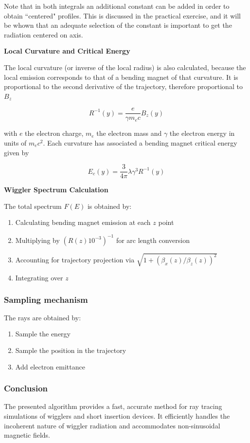 Note that in both integrals an additional constant can be added in order to obtain ``centered" profiles. This is discussed in the practical exercise, and it will be whown that an adequate selection of the constant is important to get the radiation centered on axis. 

\textbf{Local Curvature and Critical Energy}

The local curvature (or inverse of the local radius) is also
calculated, because the local emission corresponds to that of
a bending magnet of that curvature. It is proportional to the
second derivative of the trajectory, therefore proportional to $B_z$

\begin{equation}
R^{-1}(y) = \frac{e}{\gamma m_e c} B_z(y)
\end{equation}

with $e$ the electron charge, $m_e$ the electron mass and $\gamma$ the
electron energy in units of $m_e c^2$. Each curvature has associated a bending magnet critical energy given by

\begin{equation}
E_c(y) = \frac{3}{4\pi} \lambda \gamma^3 R^{-1}(y)
\end{equation}

\textbf{Wiggler Spectrum Calculation}

The total spectrum $F(E)$ is obtained by:
\begin{enumerate}
    \item Calculating bending magnet emission at each $z$ point
    \item Multiplying by $(R(z)10^{-3})^{-1}$ for arc length conversion
    \item Accounting for trajectory projection via $\sqrt{1 + (\beta_x(z)/\beta_z(z))^2}$
    \item Integrating over $z$
\end{enumerate}


\subsubsection{Sampling mechanism}

The rays are obtained by:
\begin{enumerate}
    \item Sample the energy
    \item Sample the position in the trajectory
    \item Add electron emittance
\end{enumerate}

\subsubsection{Conclusion}

The presented algorithm provides a fast, accurate method for ray tracing simulations of wigglers and short insertion devices. It efficiently handles the incoherent nature of wiggler radiation and accommodates non-sinusoidal magnetic fields.
